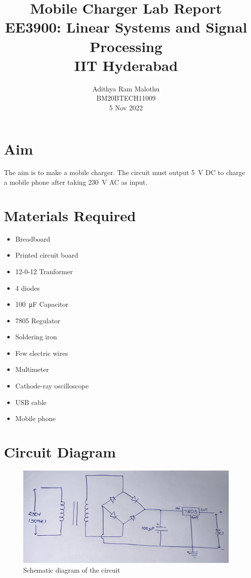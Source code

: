 \documentclass[journal,12pt,twocolumn]{IEEEtran}
\title{Mobile Charger Lab Report \\ \Large EE3900: Linear Systems and Signal Processing \\ \large IIT Hyderabad}
\author{Adithya Ram Malothu \\ \normalsize BM20BTECH11009 \\ \vspace*{20pt} \normalsize 5 Nov 2022}
\numberwithin{equation}{section}
\numberwithin{figure}{section}
\begin{document}
	\maketitle

	\section{Aim}
	The aim is to make a mobile charger. The circuit must output \SI{5}{\volt} DC to charge a mobile phone after taking \SI{230}{\volt} AC as input.
	
	\section{Materials Required}
	\begin{itemize}
	\item Breadboard
	\item Printed circuit board
	\item 12-0-12 Tranformer
	\item 4 diodes
	\item \SI{100}{\micro\farad} Capacitor
	\item 7805 Regulator
	\item Soldering iron
	\item Few electric wires
	\item Multimeter
	\item Cathode-ray oscilloscope
	\item USB cable
	\item Mobile phone
	\end{itemize}

	\section{Circuit Diagram}
	\begin{figure}[!ht]
		\centering
		\includegraphics[width=\columnwidth]{./FIGURES/circuit.jpg}
		\caption{Schematic diagram of the circuit}
		\label{fig-ckt}	
	\end{figure}
	
\end{document}

